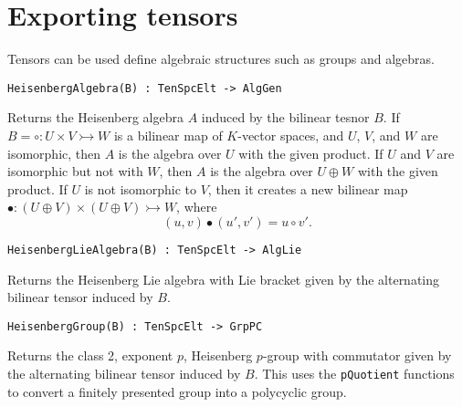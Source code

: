 \section{Exporting tensors}
Tensors can be used define algebraic structures such as groups and algebras.

\color{blue}
{\small \begin{verbatim}
HeisenbergAlgebra(B) : TenSpcElt -> AlgGen
\end{verbatim} }
\color{black}

Returns the Heisenberg algebra $A$ induced by the bilinear tesnor $B$. If $B=\circ : 
U\times V\rightarrowtail W$ is a bilinear map of $K$-vector spaces, and $U$, $V$, and 
$W$ are isomorphic, then $A$ is the algebra over $U$ with the given product. 
If 
$U$ and $V$ are isomorphic but not with $W$, then $A$ is the algebra over 
$U\oplus W$ with the given product. If $U$ is not isomorphic to $V$, then it 
creates a new bilinear map $\bullet:(U\oplus V) \times (U\oplus V)\rightarrowtail W$, 
where 
\[ (u,v)\bullet (u',v') = u\circ v'. \]

\color{blue}
{\small \begin{verbatim}
HeisenbergLieAlgebra(B) : TenSpcElt -> AlgLie
\end{verbatim} }
\color{black}

Returns the Heisenberg Lie algebra with Lie bracket given by the alternating 
bilinear tensor induced by $B$.

\color{blue}
{\small \begin{verbatim}
HeisenbergGroup(B) : TenSpcElt -> GrpPC
\end{verbatim} }
\color{black}

Returns the class 2, exponent $p$, Heisenberg $p$-group with commutator given 
by the alternating bilinear tensor induced by $B$. 
This uses the {\tt pQuotient} functions to convert a finitely presented group into a polycyclic group.


